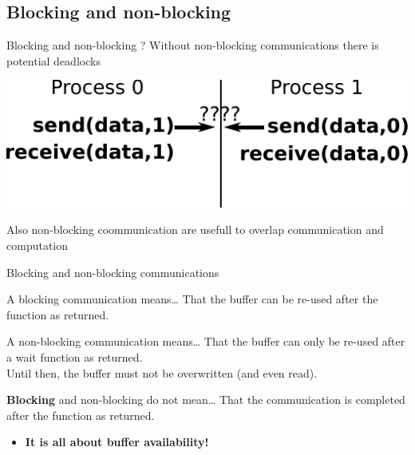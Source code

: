 \documentclass[aspectratio=43]{beamer}
\begin{document}
\subsection{Blocking and non-blocking}
\begin{frame}{Blocking and non-blocking ?}
Without non-blocking communications there is potential deadlocks

\begin{center}
\includegraphics[scale=1]{02.MPI_pt2pt/deadlock.pdf}
\end{center}

Also non-blocking coommunication are usefull to overlap communication and computation
\end{frame}

\begin{frame}{Blocking and non-blocking communications}
\begin{green1block}{A blocking communication means\ldots}
    That the buffer can be re-used after the function as returned.
\end{green1block}
\begin{green1block}{A non-blocking communication means\ldots}
    That the buffer can only be re-used after a wait function as returned.\\
    Until then, the buffer must not be overwritten (and even read).
\end{green1block}
\begin{red1block}{\textbf{Blocking} and non-blocking do not mean\ldots}
    That the communication is completed after the function as returned.
\end{red1block}
\begin{itemize}
    \item<2>[\color{cscsred}$\Rightarrow$]\color{cscsred}\textbf{It is all about buffer availability!}
\end{itemize}
\end{frame}
\end{document}
